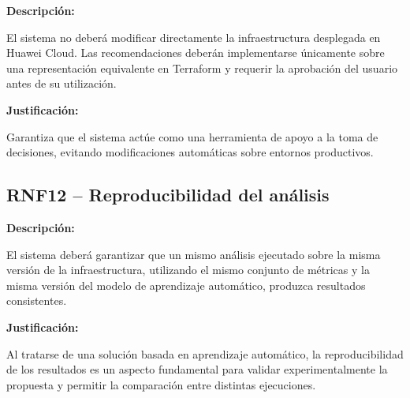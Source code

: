 \noindent \textbf{Descripción:}

El sistema no deberá modificar directamente la infraestructura desplegada en Huawei Cloud. Las recomendaciones deberán implementarse únicamente sobre una representación equivalente en Terraform y requerir la aprobación del usuario antes de su utilización.

\noindent \textbf{Justificación:}

Garantiza que el sistema actúe como una herramienta de apoyo a la toma de decisiones, evitando modificaciones automáticas sobre entornos productivos.

\subsection{RNF12 -- Reproducibilidad del análisis}

\noindent \textbf{Descripción:}

El sistema deberá garantizar que un mismo análisis ejecutado sobre la misma versión de la infraestructura, utilizando el mismo conjunto de métricas y la misma versión del modelo de aprendizaje automático, produzca resultados consistentes.

\noindent \textbf{Justificación:}

Al tratarse de una solución basada en aprendizaje automático, la reproducibilidad de los resultados es un aspecto fundamental para validar experimentalmente la propuesta y permitir la comparación entre distintas ejecuciones.







